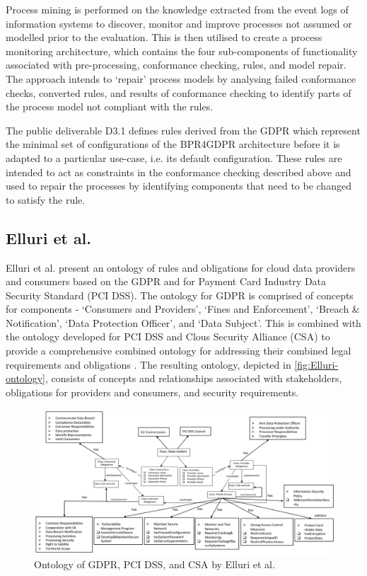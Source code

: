 Process mining is performed on the knowledge extracted from the event logs of information systems to discover, monitor and improve processes not assumed or modelled prior to the evaluation. This is then utilised to create a process monitoring architecture, which contains the four sub-components of functionality
associated with pre-processing, conformance checking, rules, and model repair.
The approach intends to `repair' process models by analysing failed conformance checks, converted rules, and results of conformance checking to identify parts of the process model not compliant with the rules. 

The public deliverable D3.1 \cite{lioudakis_d3.1_2019} defines rules derived from the GDPR which represent the minimal set of configurations of the BPR4GDPR architecture before it is adapted to a particular use-case, i.e. its default configuration. These rules are intended to act as constraints in the conformance checking described above and used to repair the processes by identifying components that need to be changed to satisfy the rule.

\subsection*{Elluri et al.}\label{sec:sota:Elluri}
Elluri et al. \cite{elluri_knowledge_2018, elluri_integrated_2018} present an ontology of rules and obligations for cloud data providers and consumers based on the GDPR and for Payment Card Industry Data Security Standard (PCI DSS). The ontology for GDPR \cite{elluri_knowledge_2018} is comprised of concepts for components - `Consumers and Providers', `Fines and Enforcement', `Breach \& Notification', `Data Protection Officer', and `Data Subject'. This is combined with the ontology developed for PCI DSS and Clous Security Alliance (CSA) to provide a comprehensive combined ontology for addressing their combined legal requirements and obligations \cite{elluri_integrated_2018}. The resulting ontology, depicted in \autoref{fig:Elluri-ontology}, consists of concepts and relationships associated with stakeholders, obligations for providers and consumers, and security requirements. 
\begin{figure}[htbp]
    \centering
    \includegraphics[width=\linewidth]{img/Elluri_ontology.png}
    \caption{Ontology of GDPR, PCI DSS, and CSA by Elluri et al. \cite{elluri_integrated_2018}}
    \label{fig:Elluri-ontology}
\end{figure}

